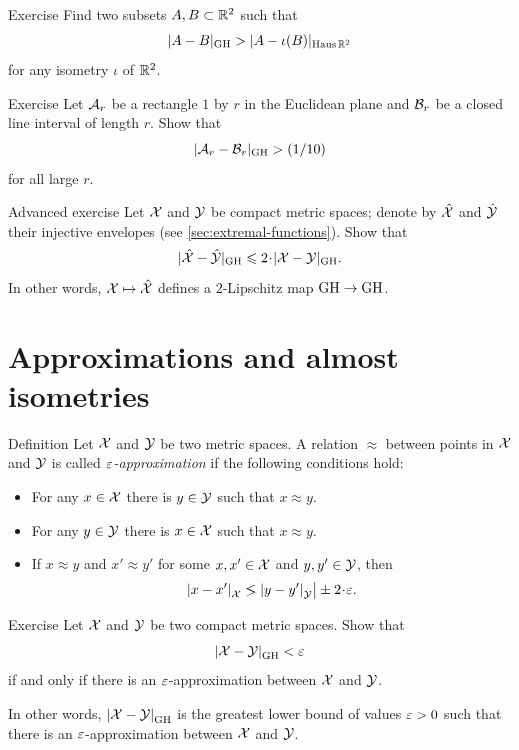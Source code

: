 \begin{thm}{Exercise}\label{ex:GH<H}
Find two subsets $A,B\subset\mathbb{R}^2$ such that 
\[|A-B|_{\operatorname{\rm GH}\nolimits}>|A-\iota(B)|_{\operatorname{\rm Haus}\nolimits\mathbb{R}^2}\]
for any isometry $\iota$ of $\mathbb{R}^2$.
\end{thm}


\begin{thm}{Exercise}\label{ex:rectangle}
Let $\mathcal{A}_r$ be a rectangle $1$ by $r$ in the Euclidean plane 
and $\mathcal{B}_r$ be a closed line interval of length $r$.
Show that 
\[|\mathcal{A}_r-\mathcal{B}_r|_{\operatorname{\rm GH}\nolimits}>(1/10)\]
for all large $r$.
\end{thm}

\begin{thm}{Advanced exercise}\label{ex:GH-inj}
Let $\mathcal{X}$ and $\mathcal{Y}$ be compact metric spaces;
denote by $\hat{\mathcal{X}}$ and $\hat{\mathcal{Y}}$ their injective envelopes (see \ref{sec:extremal-functions}).
Show that 
\[|\hat{\spc{X}}-\hat{\spc{Y}}|_{\GH}\le 2\cdot|\spc{X}- \spc{Y}|_{\GH}.\] 
In other words, $\mathcal{X}\mapsto \hat{\mathcal{X}}$ defines a $2$-Lipschitz map $\operatorname{\rm GH}\nolimits\to\operatorname{\rm GH}\nolimits$.

\end{thm}



\section{Approximations and almost isometries}\label{sec:GH-approx}

\begin{thm}{Definition}\label{ex:defGHR}
Let $\mathcal{X}$ and $\mathcal{Y}$ be two metric spaces.
A relation $\approx$ between points in $\mathcal{X}$ and $\mathcal{Y}$ is called \emph{$\varepsilon$-approximation} if the following conditions hold:
\begin{itemize}
\item For any $x\in  \mathcal{X}$ there is $y\in \mathcal{Y}$ such that $x\approx y$.
\item For any $y\in  \mathcal{Y}$ there is $x\in \mathcal{X}$ such that $x\approx y$.
\item If $x\approx y$ and $x'\approx y'$ for some $x, x'\in  \mathcal{X}$ and $y,y'\in \mathcal{Y}$, then 
\[\dist{x}{x'}{\spc{X}}\lg\dist{y}{y'}{\spc{Y}}\bigr|\pm2\cdot\eps.\]
\end{itemize}

\end{thm}

\begin{thm}{Exercise}\label{ex:H-R}
Let $\mathcal{X}$ and $\mathcal{Y}$ be two compact metric spaces.
Show that
\[\dist{\spc{X}}{\spc{Y}}{\GH}<\eps\]
if and only if there is an $\varepsilon$-approximation between $\mathcal{X}$ and $\mathcal{Y}$.

In other words, $\dist{\spc{X}}{\spc{Y}}{\GH}$ is the greatest lower bound of values $\varepsilon>0$ such that  there is an $\varepsilon$-approximation between $\mathcal{X}$ and $\mathcal{Y}$.
\end{thm}

